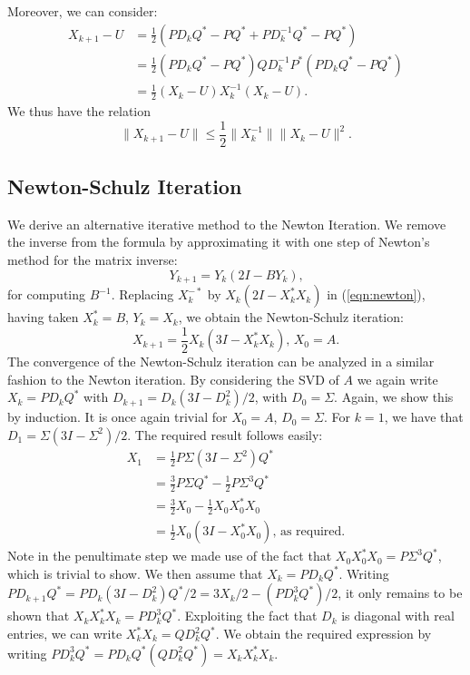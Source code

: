 \documentclass[12pt]{article}
\def\norm#1{\|#1\|}
\begin{document}
Moreover, we can consider:
\begin{align*}
  X_{k+1} - U & = \frac{1}{2}(PD_kQ^* - PQ^* + PD_k^{-1}Q^* - PQ^*) \\
  & = \frac{1}{2}(PD_kQ^* - PQ^*)QD_k^{-1}P^*(PD_kQ^* - PQ^*)\\
  & = \frac{1}{2}(X_k - U)X_k^{-1}(X_k - U)\text{.}
\end{align*}
We thus have the relation
\begin{equation}
  \norm{X_{k+1} - U} \leq \frac{1}{2}\norm{X_k^{-1}}\norm{X_k - U}^2\text{.}
\end{equation}

\subsection{Newton-Schulz Iteration}
We derive an alternative iterative method to the Newton Iteration. We remove
the inverse from the formula by approximating it with one step of Newton's
method for the matrix inverse:
\begin{equation}
  Y_{k+1} = Y_k(2I - BY_k)\text{,}
\end{equation}
for computing $B^{-1}$. Replacing $X_k^{-*}$ by $X_k(2I - X_k^*X_k)$ in
(\ref{eqn:newton}), having taken $X_k^* = B$, $Y_k = X_k$, we obtain the
Newton-Schulz iteration:
\begin{equation}
  X_{k+1} = \frac{1}{2}X_k(3I - X_k^*X_k)\text{, } X_0 = A\text{.}
\end{equation}
The convergence of the Newton-Schulz iteration can be analyzed in a similar
fashion to the Newton iteration. By considering the SVD of $A$ we again write
$X_k = PD_kQ^*$ with $D_{k+1} = D_k(3I - D_k^2)/2$, with $D_0 = \Sigma$. Again,
we show this by induction. It is once again trivial for $X_0 = A$,
$D_0 = \Sigma$. For $k = 1$, we have that $D_1 = \Sigma(3I - \Sigma^2)/2$. The
required result follows easily:
\begin{align*}
  X_{1} & = \frac{1}{2}P\Sigma(3I-\Sigma^2)Q^* \\
          & = \frac{3}{2}P\Sigma Q^* - \frac{1}{2}P\Sigma^3Q^* \\
          & = \frac{3}{2}X_0 - \frac{1}{2}X_0X_0^*X_0 \\
  & = \frac{1}{2}X_0(3I - X_0^*X_0)\text{, as required.}
\end{align*}
Note in the penultimate step we made use of the fact that
$X_0X_0^*X_0 = P\Sigma^3Q^*$, which is trivial to show. We then assume that
$X_k = PD_kQ^*$. Writing
$PD_{k+1}Q^* = PD_k(3I - D_k^2)Q^*/2 = 3X_k/2 - (PD_k^3Q^*)/2$, it only remains
to be shown that $X_kX_k^*X_k = PD_k^3Q^*$. Exploiting the fact that $D_k$ is
diagonal with real entries, we can write $X_k^*X_k = QD_k^2Q^*$. We obtain the
required expression by writing $PD_k^3Q^* = PD_kQ^*(QD_k^2Q^*) = X_kX_k^*X_k$.
\end{document}
